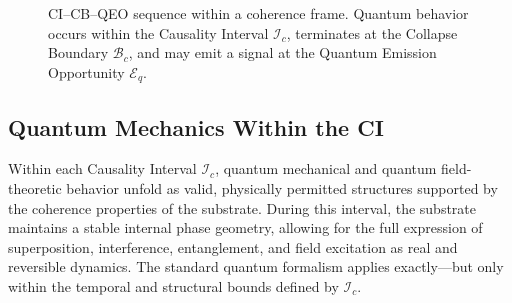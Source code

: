 \documentclass[preprints,article,submit,pdftex,moreauthors]{Definitions/mdpi}
\begin{document}
\begin{figure}[h!]
\centering
{}
\caption{CI–CB–QEO sequence within a coherence frame. Quantum behavior occurs within the Causality Interval \( \mathcal{I}_c \), terminates at the Collapse Boundary \( \mathcal{B}_c \), and may emit a signal at the Quantum Emission Opportunity \( \mathcal{E}_q \).}
\label{fig:cicbqeo}
\end{figure}


\subsection{Quantum Mechanics Within the CI}
\label{subsec:qminci}

Within each Causality Interval \( \mathcal{I}_c \), quantum mechanical and quantum field-theoretic behavior unfold as valid, physically permitted structures supported by the coherence properties of the substrate. During this interval, the substrate maintains a stable internal phase geometry, allowing for the full expression of superposition, interference, entanglement, and field excitation as real and reversible dynamics. The standard quantum formalism applies exactly—but only within the temporal and structural bounds defined by \( \mathcal{I}_c \).
\end{document}

